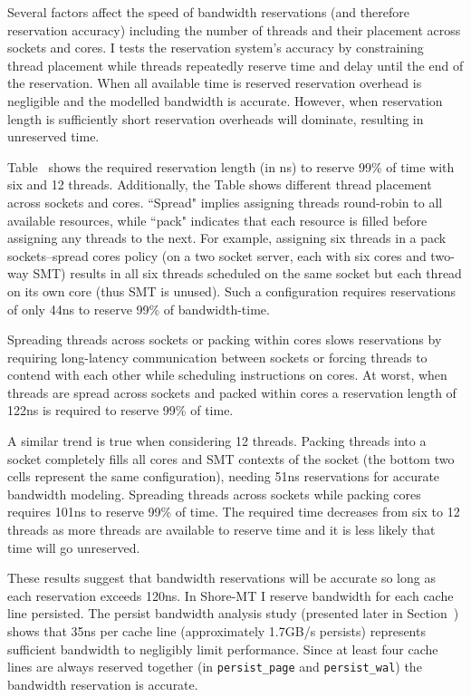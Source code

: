 

Several factors affect the speed of bandwidth reservations (and therefore reservation accuracy) including the number of threads and their placement across sockets and cores.
I tests the reservation system's accuracy by constraining thread placement while threads repeatedly reserve time and delay until the end of the reservation.
When all available time is reserved reservation overhead is negligible and the modelled bandwidth is accurate.
However, when reservation length is sufficiently short reservation overheads will dominate, resulting in unreserved time.

Table~\label{table::Reservation} shows the required reservation length (in ns) to reserve 99\% of time with six and 12 threads.
Additionally, the Table shows different thread placement across sockets and cores.
``Spread" implies assigning threads round-robin to all available resources, while ``pack" indicates that each resource is filled before assigning any threads to the next.
For example, assigning six threads in a pack sockets--spread cores policy (on a two socket server, each with six cores and two-way SMT) results in all six threads scheduled on the same socket but each thread on its own core (thus SMT is unused).
Such a configuration requires reservations of only 44ns to reserve 99\% of bandwidth-time.

Spreading threads across sockets or packing within cores slows reservations by requiring long-latency communication between sockets or forcing threads to contend with each other while scheduling instructions on cores.
At worst, when threads are spread across sockets and packed within cores a reservation length of 122ns is required to reserve 99\% of time.

A similar trend is true when considering 12 threads.
Packing threads into a socket completely fills all cores and SMT contexts of the socket (the bottom two cells represent the same configuration), needing 51ns reservations for accurate bandwidth modeling.
Spreading threads across sockets while packing cores requires 101ns to reserve 99\% of time.
The required time decreases from six to 12 threads as more threads are available to reserve time and it is less likely that time will go unreserved.

These results suggest that bandwidth reservations will be accurate so long as each reservation exceeds 120ns.
In Shore-MT I reserve bandwidth for each cache line persisted.
The persist bandwidth analysis study (presented later in Section~) shows that 35ns per cache line (approximately 1.7GB/s persists) represents sufficient bandwidth to negligibly limit performance.
Since at least four cache lines are always reserved together (in \texttt{persist\_page} and \texttt{persist\_wal}) the bandwidth reservation is accurate.

